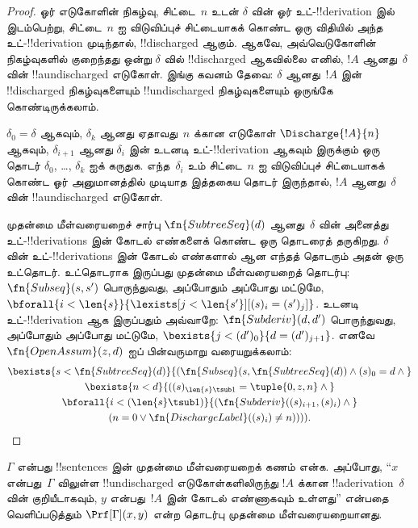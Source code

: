 \documentclass[../../../include/open-logic-section]{subfiles}
\begin{document}
\begin{proof}
  ஓர் எடுகோளின் நிகழ்வு, சிட்டை~$n$ உடன் $\delta$ வின் ஓர்
  உட்-!!{derivation} இல் இடம்பெற்று, சிட்டை~$n$ ஐ விடுவிப்புச் சிட்டையாகக்
  கொண்ட ஒரு விதியில் அந்த உட்-!!{derivation} முடிந்தால்,
  !!{discharged} ஆகும். ஆகவே, அவ்வெடுகோளின் நிகழ்வுகளில் குறைந்தது ஒன்று
  $\delta$ வில் !!{discharged} ஆகவில்லை எனில், $!A$ ஆனது~$\delta$ வின்
  !!a{undischarged} எடுகோள். இங்கு கவனம் தேவை: $\delta$ ஆனது~$!A$ இன்
  !!{discharged} நிகழ்வுகளையும் !!{undischarged} நிகழ்வுகளையும்
  ஒருங்கே கொண்டிருக்கலாம்.

  $\delta_0 = \delta$ ஆகவும், $\delta_k$ ஆனது ஏதாவது~$n$ க்கான
  எடுகோள் $\Discharge{!A}{n}$ ஆகவும், $\delta_{i+1}$ ஆனது
  $\delta_i$ இன் உடனடி உட்-!!{derivation} ஆகவும் இருக்கும் ஒரு தொடர்
  $\delta_0$, \dots, $\delta_k$ ஐக் கருதுக. எந்த~$\delta_i$ உம்
  சிட்டை~$n$ ஐ விடுவிப்புச் சிட்டையாகக் கொண்ட ஓர் அனுமானத்தில் முடியாத
  இத்தகைய தொடர் இருந்தால், $!A$ ஆனது~$\delta$ வின்
  !!a{undischarged} எடுகோள்.

  முதன்மை மீள்வரையறைச் சார்பு $\fn{SubtreeSeq}(d)$ ஆனது~$\delta$ வின்
  அனைத்து உட்-!!{derivation}s இன் கோடல் எண்களைக் கொண்ட ஒரு தொடரைத்
  தருகிறது. $\delta$ வின் உட்-!!{derivation}s இன் கோடல் எண்களால் ஆன எந்தத்
  தொடரும் அதன் ஒரு உட்தொடர். உட்தொடராக இருப்பது முதன்மை மீள்வரையறைத்
  தொடர்பு: $\fn{Subseq}(s, s')$ பொருந்துவது, அப்போதும் அப்போது மட்டுமே,
  $\bforall{i<\len{s}}{\lexists[j<\len{s'}][(s)_i = (s')_j]}$.
  உடனடி உட்-!!{derivation} ஆக இருப்பதும் அவ்வாறே:
  $\fn{Subderiv}(d, d')$ பொருந்துவது, அப்போதும் அப்போது மட்டுமே,
  $\bexists{j<(d')_0}{d = (d')_{j+1}}$. எனவே
  $\fn{OpenAssum}(z, d)$ ஐப் பின்வருமாறு வரையறுக்கலாம்:
  \begin{multline*}
    \bexists{s<\fn{SubtreeSeq}(d)}{(\fn{Subseq}(s, \fn{SubtreeSeq}(d))
      \land (s)_0 = d \land {}} \\
    \bexists{n<d}{((s)_{\len{s} \tsub 1} = \tuple{0, z, n} \land {}}\\
      \bforall{i<(\len{s} \tsub 1)}{(\fn{Subderiv}((s)_{i+1}, (s)_i) \land {}}\\
      (n = 0 \lor \fn{DischargeLabel}((s)_i) \neq n)))).
  \end{multline*}
\end{proof}

\begin{prop}
  $\Gamma$ என்பது !!{sentence}s இன் முதன்மை மீள்வரையறைக் கணம் என்க.
  அப்போது, “$x$ என்பது~$\Gamma$ விலுள்ள !!{undischarged} எடுகோள்களிலிருந்து
  $!A$ க்கான !!a{derivation}~$\delta$ வின் குறியீடாகவும், $y$ என்பது~$!A$
  இன் கோடல் எண்ணாகவும் உள்ளது” என்பதை வெளிப்படுத்தும்
  $\Prf[\Gamma](x, y)$ என்ற தொடர்பு முதன்மை மீள்வரையறையானது.
\end{prop}
\end{document}
